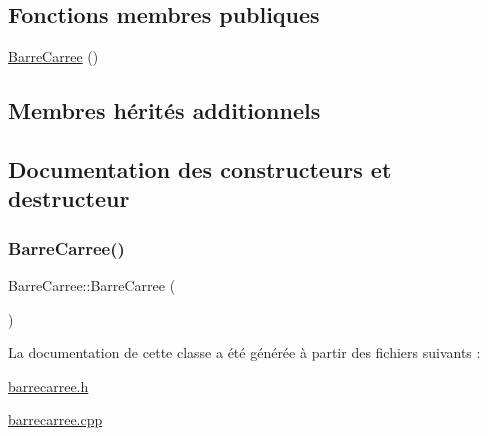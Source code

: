 \subsection*{Fonctions membres publiques}
\begin{DoxyCompactItemize}
\item 
\hyperlink{class_barre_carree_a1fee50f3a72acb83aaf036024b872447}{Barre\+Carree} ()
\end{DoxyCompactItemize}
\subsection*{Membres hérités additionnels}


\subsection{Documentation des constructeurs et destructeur}
\mbox{\label{class_barre_carree_a1fee50f3a72acb83aaf036024b872447}} 
\subsubsection{\texorpdfstring{Barre\+Carree()}{BarreCarree()}}
{\footnotesize\ttfamily Barre\+Carree\+::\+Barre\+Carree (\begin{DoxyParamCaption}{ }\end{DoxyParamCaption})}



La documentation de cette classe a été générée à partir des fichiers suivants \+:\begin{DoxyCompactItemize}
\item 
\hyperlink{barrecarree_8h}{barrecarree.\+h}\item 
\hyperlink{barrecarree_8cpp}{barrecarree.\+cpp}\end{DoxyCompactItemize}
